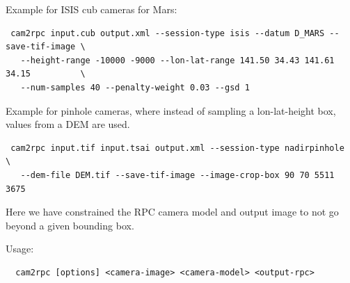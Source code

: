 Example for ISIS cub cameras for Mars:

\begin{verbatim}
 cam2rpc input.cub output.xml --session-type isis --datum D_MARS --save-tif-image \
   --height-range -10000 -9000 --lon-lat-range 141.50 34.43 141.61 34.15          \
   --num-samples 40 --penalty-weight 0.03 --gsd 1
\end{verbatim}

Example for pinhole cameras, where instead of sampling a lon-lat-height box,
values from a DEM are used.
\begin{verbatim}
 cam2rpc input.tif input.tsai output.xml --session-type nadirpinhole             \
   --dem-file DEM.tif --save-tif-image --image-crop-box 90 70 5511 3675
\end{verbatim}

Here we have constrained the RPC camera model and output image to not go beyond
a given bounding box. 

Usage:
\begin{verbatim}
  cam2rpc [options] <camera-image> <camera-model> <output-rpc>
\end{verbatim}

